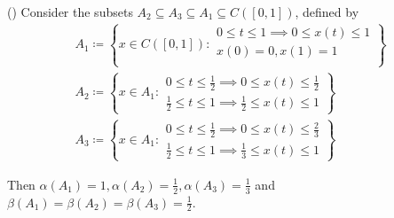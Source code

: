\begin{example}\label{ex:noncompactness_measures}(\cite[exercise 7.3]{Deimling1985})
  Consider the subsets $A_2 \subseteq A_3 \subseteq A_1 \subseteq C([0, 1])$, defined by
  \begin{align*}
    A_1 \coloneqq \left\{
      x \in C([0, 1]) \colon \begin{aligned}
        0 \leq t \leq 1 \implies 0 \leq x(t) \leq 1 \\
        x(0) = 0, x(1) = 1 \\
      \end{aligned}
    \right\}
    \\
    A_2 \coloneqq \left\{
      x \in A_1 \colon \begin{aligned}
        0 \leq t \leq \frac 1 2 \implies 0 \leq x(t) \leq \frac 1 2 \\
        \frac 1 2 \leq t \leq 1 \implies \frac 1 2 \leq x(t) \leq 1
      \end{aligned}
    \right\}
    \\
    A_3 \coloneqq \left\{
      x \in A_1 \colon \begin{aligned}
        0 \leq t \leq \frac 1 2 \implies 0 \leq x(t) \leq \frac 2 3 \\
        \frac 1 2 \leq t \leq 1 \implies \frac 1 3 \leq x(t) \leq 1
      \end{aligned}
    \right\}
  \end{align*}

  Then $\alpha(A_1) = 1, \alpha(A_2) = \frac 1 2, \alpha(A_3) = \frac 1 3$ and $\beta(A_1) = \beta(A_2) = \beta(A_3) = \frac 1 2$.
\end{example}
